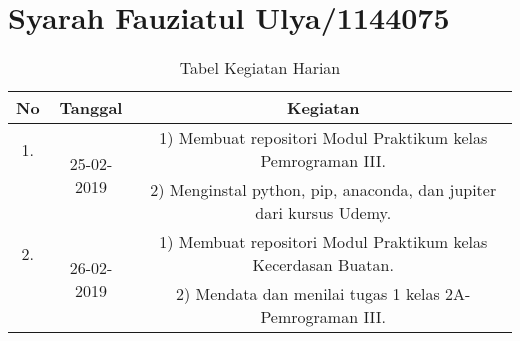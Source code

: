 \chapter{Syarah Fauziatul Ulya/1144075}
\begin{table}[h]
\caption{Tabel Kegiatan Harian}
\centering
\begin{tabular}{|c|c|c|}
\hline
No&Tanggal&Kegiatan\\
\hline
1.&\multirow{2}{*}{25-02-2019}&1) Membuat repositori Modul Praktikum kelas Pemrograman III.\\
&&2) Menginstal python, pip, anaconda, dan jupiter dari kursus Udemy.\\
\hline
2.&\multirow{2}{*}{26-02-2019}&1) Membuat repositori Modul Praktikum kelas Kecerdasan Buatan.\\
&&2) Mendata dan menilai tugas 1 kelas 2A- Pemrograman III.\\
\hline
\end{tabular}
\label{table:contoh}
\end{table}